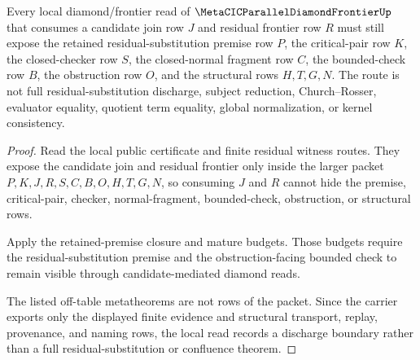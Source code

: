 \begin{theorem}
\label{thm:metacic-parallel-diamond-frontier-retained-premise-discharge-boundary}
Every local diamond/frontier read of $\MetaCICParallelDiamondFrontierUp$ that consumes a candidate join row $J$ and residual frontier row $R$ must still expose the retained residual-substitution premise row $P$, the critical-pair row $K$, the closed-checker row $S$, the closed-normal fragment row $C$, the bounded-check row $B$, the obstruction row $O$, and the structural rows $H,T,G,N$. The route is not full residual-substitution discharge, subject reduction, Church--Rosser, evaluator equality, quotient term equality, global normalization, or kernel consistency.
\end{theorem}
\begin{proof}
Read the local public certificate and finite residual witness routes. They expose the candidate join and residual frontier only inside the larger packet $P,K,J,R,S,C,B,O,H,T,G,N$, so consuming $J$ and $R$ cannot hide the premise, critical-pair, checker, normal-fragment, bounded-check, obstruction, or structural rows.

Apply the retained-premise closure and mature budgets. Those budgets require the residual-substitution premise and the obstruction-facing bounded check to remain visible through candidate-mediated diamond reads.

The listed off-table metatheorems are not rows of the packet. Since the carrier exports only the displayed finite evidence and structural transport, replay, provenance, and naming rows, the local read records a discharge boundary rather than a full residual-substitution or confluence theorem.
\end{proof}

